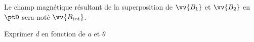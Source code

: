 
\smallskip

Le champ magnétique résultant de la superposition de $\vv{B_1}$ et $\vv{B_2} $ en $\ptD$ sera noté $\vv{B_{\text{tot}}}$.

\smallskip



\begin{enonce}
Exprimer $d$ en fonction de $a$ et $\theta$
\end{enonce}


